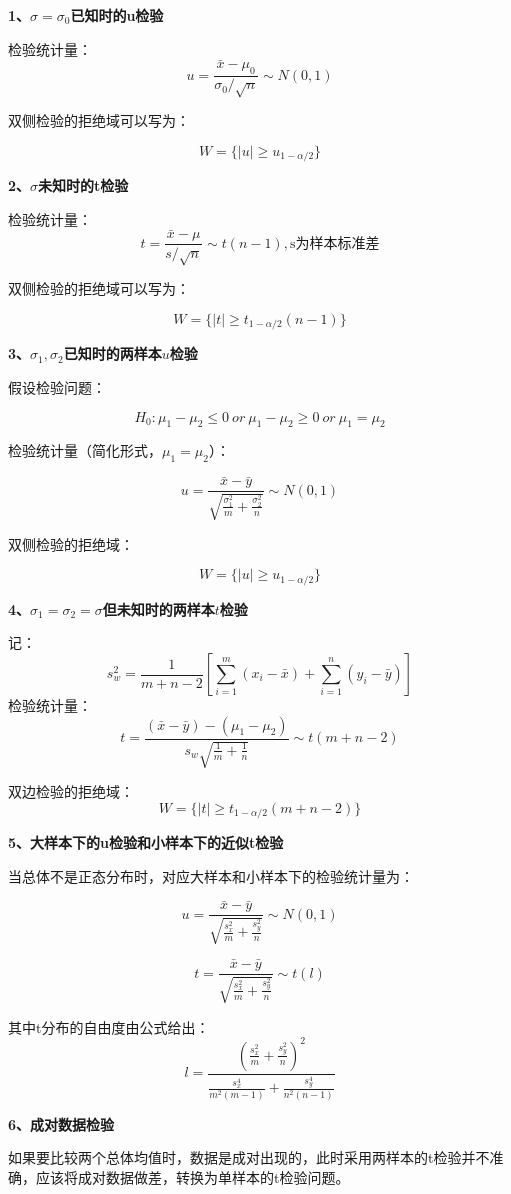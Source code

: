 \documentclass[
]{book}
\begin{document}
\textbf{1、}\(\sigma=\sigma_0\)\textbf{已知时的u检验}

检验统计量： \[
u=\frac{\bar{x}-\mu_0}{\sigma_0/\sqrt{n}}\sim N(0,1)
\]

双侧检验的拒绝域可以写为：

\[
W=\{|u|\geq u_{1-\alpha/2}\}
\]

\textbf{2、}\(\sigma\)\textbf{未知时的t检验}

检验统计量： \[
t=\frac{\bar{x}-\mu}{s/\sqrt{n}}\sim t(n-1),\text{s为样本标准差}
\]

双侧检验的拒绝域可以写为：

\[
W=\{|t|\geq t_{1-\alpha/2}(n-1)\}
\]

\textbf{3、}\(\sigma_1,\sigma_2\)\textbf{已知时的两样本}\(u\)\textbf{检验}

假设检验问题：

\[
H_0:\mu_1-\mu_2\leq0\ or\ \mu_1-\mu_2\geq0 \ or \ \mu_1=\mu_2
\]

检验统计量（简化形式，\(\mu_1=\mu_2\)）：

\[
u=\frac{\bar{x}-\bar{y}}{\sqrt{\frac{\sigma_1^2}{m}+\frac{\sigma_2^2}{n}}}\sim N(0,1)
\]

双侧检验的拒绝域：

\[
W=\{|u|\geq u_{1-\alpha/2}\}
\]

\textbf{4、}\(\sigma_1=\sigma_2=\sigma\)\textbf{但未知时的两样本}\(t\)\textbf{检验}

记： \[
s_w^2=\frac{1}{m+n-2}[\sum_{i=1}^m(x_i-\bar{x})+\sum_{i=1}^n(y_i-\bar{y})]
\] 检验统计量： \[
t=\frac{(\bar{x}-\bar{y})-(\mu_1-\mu_2)}{s_w\sqrt{\frac{1}{m}+\frac{1}{n}}}\sim t(m+n-2)
\]

双边检验的拒绝域： \[
W=\{|t|\geq t_{1-\alpha/2}(m+n-2)\}
\]

\textbf{5、大样本下的u检验和小样本下的近似t检验}

当总体不是正态分布时，对应大样本和小样本下的检验统计量为：

\[
u=\frac{\bar{x}-\bar{y}}{\sqrt{\frac{s_x^2}{m}+\frac{s_y^2}{n}}}\sim N(0,1)
\]

\[
t=\frac{\bar{x}-\bar{y}}{\sqrt{\frac{s_x^2}{m}+\frac{s_y^2}{n}}}\sim t(l)
\]

其中t分布的自由度由公式给出： \[
l=\frac{(\frac{s_x^2}{m}+\frac{s_y^2}{n})^2}{\frac{s_x^4}{m^2(m-1)}+\frac{s_y^4}{n^2(n-1)}}
\]

\textbf{6、成对数据检验}

如果要比较两个总体均值时，数据是成对出现的，此时采用两样本的t检验并不准确，应该将成对数据做差，转换为单样本的t检验问题。
\end{document}
